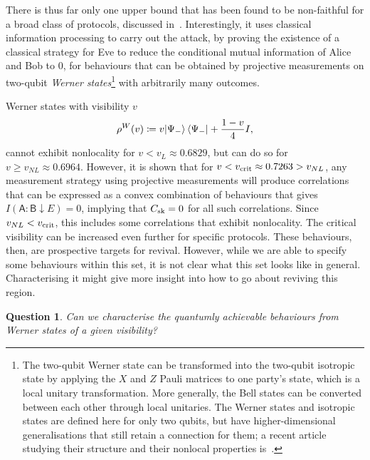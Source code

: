 \documentclass[10pt, a4paper]{article}
\numberwithin{equation}{section} %
\theoremstyle{definition}
\theoremstyle{plain}
\newtheorem{question}{Question}
\newcommand{\?}{\mathrel{?}} %
\newcommand{\crv}[1]{\mathsf{#1}}
\newcommand{\sk}{\rm sk}
\newcommand{\crit}{\rm crit}
\begin{document}

    There is thus far only one upper bound that has been found to be non-faithful for a broad class of protocols, discussed in~\cite{NotSufficient}. Interestingly, it uses classical information processing to carry out the attack, by proving the existence of a classical strategy for Eve to reduce the conditional mutual information of Alice and Bob to 0, for behaviours that can be obtained by projective measurements on two-qubit \emph{Werner states}\footnote{The two-qubit Werner state can be transformed into the two-qubit isotropic state by applying the \(X\) and \(Z\) Pauli matrices to one party's state, which is a local unitary transformation. More generally, the Bell states can be converted between each other through local unitaries. The Werner states and isotropic states are defined here for only two qubits, but have higher-dimensional generalisations that still retain a connection for them; a recent article studying their structure and their nonlocal properties is~\cite{WernerIsotropicDecomp}.}  with arbitrarily many outcomes.

    Werner states with visibility \(v\)
    \begin{equation}
      \rho^{W}(v) \coloneqq v{\ket{\Psi_-}\bra{\Psi_-}} + \frac{1-v}{4}I,
    \end{equation}
    cannot exhibit nonlocality for \(v < v_L \approx 0.6829\), but can do so for \(v \geq v_{NL} \approx 0.6964\). However, it is shown that for \(v < v_{\crit} \approx 0.7263 > v_{NL}\), any measurement strategy using projective measurements will produce correlations that can be expressed as a convex combination of behaviours that gives \(I(\crv{A}:\crv{B} \downarrow E) = 0\), implying that \(C_{\sk} = 0\) for all such correlations. Since \(v_{NL} < v_{\crit}\), this includes some correlations that exhibit nonlocality. The critical visibility can be increased even further for specific protocols. These behaviours, then, are prospective targets for revival. However, while we are able to specify some behaviours within this set, it is not clear what this set looks like in general. Characterising it might give more insight into how to go about reviving this region.

    \begin{question}
      Can we characterise the quantumly achievable behaviours from Werner states of a given visibility?
    \end{question}
\end{document}
